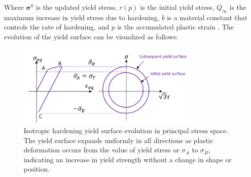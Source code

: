 \documentclass[12pt]{article}
\begin{document}
Where $\boldsymbol{\sigma}^0$ is the updated yield stress, $r(p)$ is the initial yield stress, 
$Q_\infty$ is the maximum increase in yield stress due to hardening, $b$ is a material constant that controls the rate of hardening, 
and $p$ is the accumulated plastic strain \cite{mehani2024modified}. The evolution of the yield surface can be visualized as follows:
\begin{figure}[H]
    \centering
    \includegraphics[width=0.8\textwidth]{images/Isotropic_Hardening.png}
    \caption{Isotropic hardening yield surface evolution in principal stress space. 
    The yield surface expands uniformly in all directions as plastic deformation occurs from the 
    value of yield stress or $\sigma_{A}$ to
    $\sigma_{B}$, 
    indicating an increase in yield strength without a change in shape or position. \cite{jahed2021cyclic}}
    \label{fig:isotropic_hardening}
\end{figure}
\end{document}
